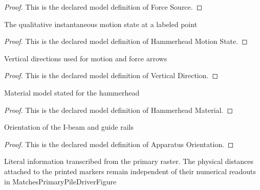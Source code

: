 \begin{proof}
  This is the declared model definition of Force Source.
\end{proof}
\begin{definition}
  \label{def:physics:phyx-mini-0808:phyxminiproblems-problemphyxmini0808-hammerheadmotionstate}
  The qualitative instantaneous motion state at a labeled point
\end{definition}
\begin{proof}
  This is the declared model definition of Hammerhead Motion State.
\end{proof}
\begin{definition}
  \label{def:physics:phyx-mini-0808:phyxminiproblems-problemphyxmini0808-verticaldirection}
  Vertical directions used for motion and force arrows
\end{definition}
\begin{proof}
  This is the declared model definition of Vertical Direction.
\end{proof}
\begin{definition}
  \label{def:physics:phyx-mini-0808:phyxminiproblems-problemphyxmini0808-hammerheadmaterial}
  Material model stated for the hammerhead
\end{definition}
\begin{proof}
  This is the declared model definition of Hammerhead Material.
\end{proof}
\begin{definition}
  \label{def:physics:phyx-mini-0808:phyxminiproblems-problemphyxmini0808-apparatusorientation}
  Orientation of the I-beam and guide rails
\end{definition}
\begin{proof}
  This is the declared model definition of Apparatus Orientation.
\end{proof}
\begin{definition}
  \label{def:physics:phyx-mini-0808:phyxminiproblems-problemphyxmini0808-piledriverfigure}
  Literal information transcribed from the primary raster. The physical distances attached to the printed markers remain independent of their numerical readouts in MatchesPrimaryPileDriverFigure
\end{definition}
